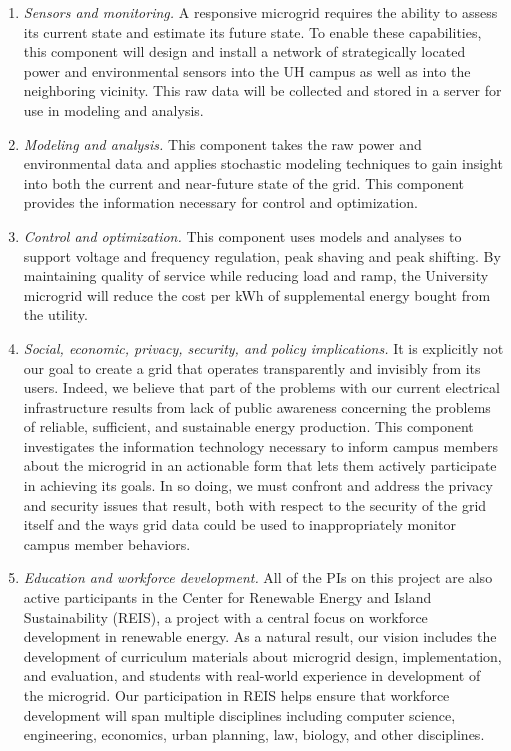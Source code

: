 \begin{enumerate}

\item {\em Sensors and monitoring.} A responsive microgrid requires the
  ability to assess its current state and estimate its future state.  To
  enable these capabilities, this component will design and install a
  network of strategically located power and environmental sensors into the
  UH campus as well as into the neighboring vicinity. This raw data will be
  collected and stored in a server for use in modeling and analysis.

\item {\em Modeling and analysis.}  This component takes the raw power and
  environmental data and applies stochastic modeling techniques to gain
  insight into both the current and near-future state of the grid.  This
  component provides the information necessary for control and
  optimization.

\item {\em Control and optimization.}  This component uses models and
  analyses to support voltage and frequency regulation, peak shaving and
  peak shifting.  By maintaining quality of service while reducing load and
  ramp, the University microgrid will reduce the cost per kWh of
  supplemental energy bought from the utility.

\item {\em Social, economic, privacy, security, and policy implications.}
  It is explicitly not our goal to create a grid that operates
  transparently and invisibly from its users.  Indeed, we believe that part
  of the problems with our current electrical infrastructure results from
  lack of public awareness concerning the problems of reliable, sufficient,
  and sustainable energy production.  This component investigates the
  information technology necessary to inform campus members about the
  microgrid in an actionable form that lets them actively participate in
  achieving its goals.  In so doing, we must confront and address the
  privacy and security issues that result, both with respect to the
  security of the grid itself and the ways grid data could be used to
  inappropriately monitor campus member behaviors.

\item {\em Education and workforce development.} All of the PIs on this
  project are also active participants in the Center for Renewable Energy
  and Island Sustainability (REIS), a project with a central focus on
  workforce development in renewable energy.  As a natural result, our
  vision includes the development of curriculum materials about microgrid
  design, implementation, and evaluation, and students with real-world
  experience in development of the microgrid.  Our participation in REIS
  helps ensure that workforce development will span multiple disciplines
  including computer science, engineering, economics, urban planning, law,
  biology, and other disciplines.

\end{enumerate}

